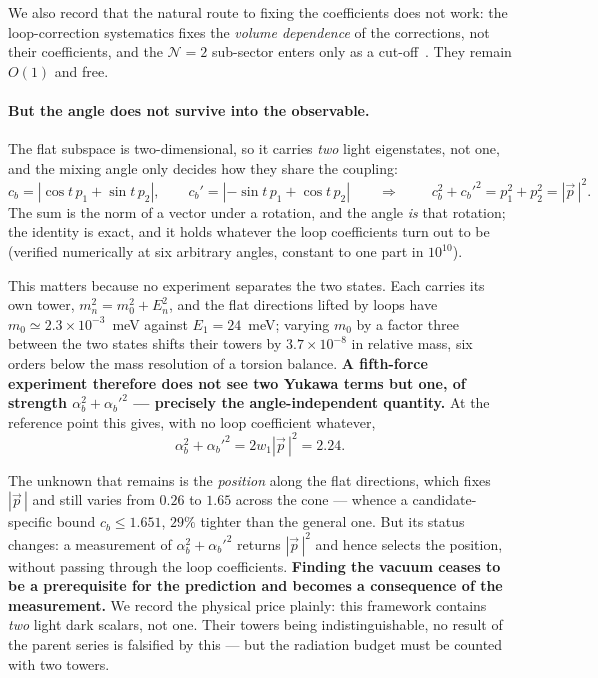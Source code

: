 We also record that the natural route to fixing the coefficients does not work: the loop-correction systematics fixes the \emph{volume dependence} of the corrections, not their coefficients, and the $\mathcal N=2$ sub-sector enters only as a cut-off~\cite{CCQ}. They remain $O(1)$ and free.

\paragraph{But the angle does not survive into the observable.} The flat subspace is two-dimensional, so it carries \emph{two} light eigenstates, not one, and the mixing angle only decides how they share the coupling:
\begin{equation}
c_b=|\cos t\,p_1+\sin t\,p_2|,\qquad c_b'=|-\sin t\,p_1+\cos t\,p_2|
\qquad\Longrightarrow\qquad
\boxed{\;c_b^{2}+c_b'^{2}=p_1^{2}+p_2^{2}=|\vec p\,|^{2}.\;}
\end{equation}
The sum is the norm of a vector under a rotation, and the angle \emph{is} that rotation; the identity is exact, and it holds whatever the loop coefficients turn out to be (verified numerically at six arbitrary angles, constant to one part in $10^{10}$).

This matters because no experiment separates the two states. Each carries its own tower, $m_n^2=m_0^2+E_n^2$, and the flat directions lifted by loops have $m_0\simeq2.3\times10^{-3}$~meV against $E_1=24$~meV; varying $m_0$ by a factor three between the two states shifts their towers by $3.7\times10^{-8}$ in relative mass, six orders below the mass resolution of a torsion balance. \textbf{A fifth-force experiment therefore does not see two Yukawa terms but one, of strength $\alpha_b^2+\alpha_b'^2$ --- precisely the angle-independent quantity.} At the reference point this gives, with no loop coefficient whatever,
\begin{equation}
\alpha_b^2+\alpha_b'^2=2w_1|\vec p\,|^2=2.24 .
\end{equation}

The unknown that remains is the \emph{position} along the flat directions, which fixes $|\vec p\,|$ and still varies from $0.26$ to $1.65$ across the cone --- whence a candidate-specific bound $c_b\leq1.651$, $29\%$ tighter than the general one. But its status changes: a measurement of $\alpha_b^2+\alpha_b'^2$ returns $|\vec p\,|^2$ and hence selects the position, without passing through the loop coefficients. \textbf{Finding the vacuum ceases to be a prerequisite for the prediction and becomes a consequence of the measurement.} We record the physical price plainly: this framework contains \emph{two} light dark scalars, not one. Their towers being indistinguishable, no result of the parent series is falsified by this --- but the radiation budget must be counted with two towers.

